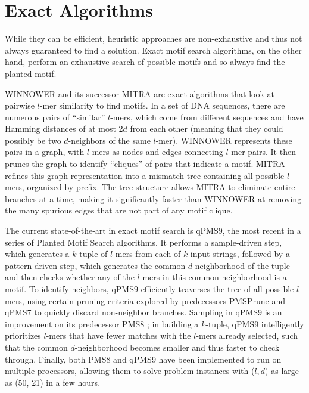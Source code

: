 \documentclass[oneside,12pt]{DISCSthesis}
\begin{document}
	\section{Exact Algorithms}
		While they can be efficient, heuristic approaches are non-exhaustive and thus not always guaranteed to find a solution. Exact motif search algorithms, on the other hand, perform an exhaustive search of possible motifs and so always find the planted motif.

		WINNOWER \cite{pevzner2000combinatorial} and its successor MITRA \cite{eskin2002finding} are exact algorithms that look at pairwise $l$-mer similarity to find motifs. In a set of DNA sequences, there are numerous pairs of ``similar'' $l$-mers, which come from different sequences and have Hamming distances of at most 2$d$ from each other (meaning that they could possibly be two $d$-neighbors of the same $l$-mer). WINNOWER represents these pairs in a graph, with $l$-mers as nodes and edges connecting $l$-mer pairs. It then prunes the graph to identify ``cliques'' of pairs that indicate a motif. MITRA refines this graph representation into a mismatch tree containing all possible $l$-mers, organized by prefix. The tree structure allows MITRA to eliminate entire branches at a time, making it significantly faster than WINNOWER at removing the many spurious edges that are not part of any motif clique.

		The current state-of-the-art in exact motif search is qPMS9, the most recent in a series \cite{pms2007,pms2014,pms2015} of Planted Motif Search algorithms. It performs a sample-driven step, which generates a $k$-tuple of $l$-mers from each of $k$ input strings, followed by a pattern-driven step, which generates the common $d$-neighborhood of the tuple and then checks whether any of the $l$-mers in this common neighborhood is a motif. To identify neighbors, qPMS9 efficiently traverses the tree of all possible $l$-mers, using certain pruning criteria explored by predecessors PMSPrune and qPMS7 \cite{pms2007} to quickly discard non-neighbor branches. Sampling in qPMS9 is an improvement on its predecessor PMS8 \cite{pms2014}; in building a $k$-tuple, qPMS9 intelligently prioritizes $l$-mers that have fewer matches with the $l$-mers already selected, such that the common $d$-neighborhood becomes smaller and thus faster to check through.  Finally, both PMS8 and qPMS9 have been implemented to run on multiple processors, allowing them to solve problem instances with ($l, d$) as large as (50, 21) in a few hours.
\end{document}

